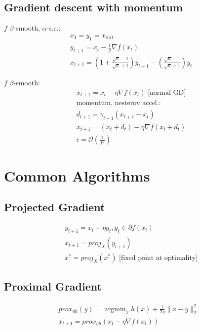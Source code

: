 \documentclass[8pt,letter]{article}
\DeclareMathOperator*{\argmin}{argmin}
\begin{document}
\begin{multicols*}{2}
  \subsection {Gradient descent with momentum}
  $f$ $\beta$-smooth, $\alpha$-s.c.:
  \begin{align*}
    & x_1=y_1 = x_{init}\\
    & y_{t+1} = x_t - \frac{1}{\beta} \nabla f(x_t)\\
    & x_{t+1} = \left(1+\frac{\sqrt{\kappa}-1}{\sqrt{\kappa}+1}\right) y_{t+1} - \left(\frac{\sqrt{\kappa}-1}{\sqrt{\kappa}+1}\right) y_t
  \end{align*}

  $f$ $\beta$-smooth:
  \begin{align*}
    & x_{t+1}=x_t-\eta \nabla f(x_t) \text{ [normal GD]}\\
    & \text{momentum, nesterov accel.:}\\
    & d_{t+1} = \gamma_{t+1}(x_{t+1} - x_t)\\
    & x_{t+1} = (x_t + d_t) - \eta \nabla f(x_t + d_t)\\
    & \epsilon=\mathcal{O}\left(\frac{1}{T^2}\right)
  \end{align*}

  \vfill\null
  \pagebreak
    
  \section {Common Algorithms}

  \subsection {Projected Gradient}
  \begin{align*}
    & y_{t+1} = x_t - \eta g_t, g_t \in \partial f(x_t)\\
    & x_{t+1} = proj_{X}(y_{t+1})\\
    & x^*=proj_{X}(x^*) \text{ [fixed point at optimality]}
  \end{align*}
  
  \subsection {Proximal Gradient}
  \begin{align*}
    prox_{\eta h}(y) = \argmin_x h(x) + \frac{1}{2 \eta} \|x-y\|_2^2\\
    x_{t+1} = prox_{\eta h}(x_t - \eta \nabla f(x_t))
  \end{align*}
  

\end{multicols*}
\end{document}
